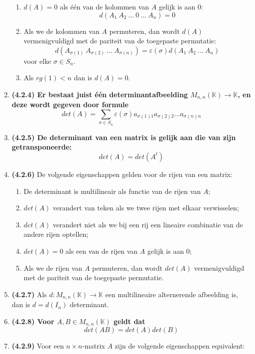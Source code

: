 \documentclass[12pt]{article}
\begin{document}
\begin{enumerate}
\begin{enumerate}
            \item $d(A)=0$ als één van de kolommen van $A$ gelijk is aan $0$: $$d(A_1 \ A_2 \ \dots \ 0 \ \dots \ A_n)=0$$
            \item Als we de kolommen van $A$ permuteren, dan wordt $d(A)$ vermenigvuldigd met de pariteit van de toegepaste permutatie: $$d(A_{\sigma(1)} \ A_{\sigma(2)} \ \dots \ A_{\sigma(n)})= \varepsilon(\sigma)d(A_1 \ A_2 \ \dots \ A_n)$$ voor elke $\sigma \in S_n$.
            \item Als $rg(1)<n$ dan is $d(A)=0$.
        \end{enumerate}
        \item \textbf{\textbf{(4.2.4)} Er bestaat juist één determinantafbeelding $M_{n,n}(\mathbb{K}) \rightarrow \mathbb{K}$, en deze wordt gegeven door formule $$det(A)= \sum_{\sigma \in S_n} \varepsilon(\sigma)a_{\sigma(1)1}a_{\sigma(2)2} \dots a_{\sigma(n)n}$$}
        \item \textbf{\textbf{(4.2.5)} De determinant van een matrix is gelijk aan die van zijn getransponeerde: $$det(A)=det(A^t)$$}
        \item \textbf{(4.2.6)} De volgende eigenschappen gelden voor de rijen van een matrix: \begin{enumerate}
            \item De determinant is multilineair als functie van de rijen van $A$;
            \item $det(A)$ verandert van teken als we twee rijen met elkaar verwisselen;
            \item $det(A)$ verandert niet als we bij een rij een lineaire combinatie van de andere rijen optellen;
            \item $det(A)=0$ als een van de rijen van $A$ gelijk is aan $0$;
            \item Als we de rijen van $A$ permuteren, dan wordt $det(A)$ vermenigvuldigd met de pariteit van de toegepaste permutatie. 
        \end{enumerate}
        \item \textbf{(4.2.7)} Als $d:M_{n,n}(\mathbb{K}) \rightarrow \mathbb{K}$ een multilineaire alternerende afbeelding is, dan is $d=d(I_n)$ determinant.
        \item \textbf{\textbf{(4.2.8)} Voor $A,B \in M_{n,n}(\mathbb{K})$ geldt dat $$det(AB)=det(A)det(B)$$}
        \item \textbf{(4.2.9)} Voor een $n \times n$-matrix $A$ zijn de volgende eigenschappen equivalent: \begin{enumerate}

\end{enumerate}
\end{enumerate}
\end{document}
